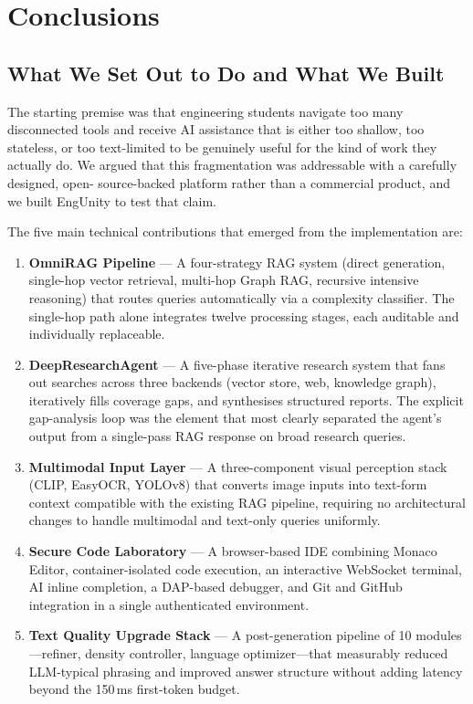\chapter{Conclusions}
\label{chap:conclusions}

\section{What We Set Out to Do and What We Built}
\label{sec:what-we-built}

The starting premise was that engineering students navigate too many disconnected
tools and receive AI assistance that is either too shallow, too stateless, or too
text-limited to be genuinely useful for the kind of work they actually do. We
argued that this fragmentation was addressable with a carefully designed, open-
source-backed platform rather than a commercial product, and we built EngUnity
to test that claim.

The five main technical contributions that emerged from the implementation are:

\begin{enumerate}
    \item \textbf{OmniRAG Pipeline} --- A four-strategy RAG system (direct
    generation, single-hop vector retrieval, multi-hop Graph RAG, recursive
    intensive reasoning) that routes queries automatically via a complexity
    classifier. The single-hop path alone integrates twelve processing stages,
    each auditable and individually replaceable.

    \item \textbf{DeepResearchAgent} --- A five-phase iterative research system
    that fans out searches across three backends (vector store, web, knowledge
    graph), iteratively fills coverage gaps, and synthesises structured reports.
    The explicit gap-analysis loop was the element that most clearly separated
    the agent's output from a single-pass RAG response on broad research queries.

    \item \textbf{Multimodal Input Layer} --- A three-component visual
    perception stack (CLIP, EasyOCR, YOLOv8) that converts image inputs into
    text-form context compatible with the existing RAG pipeline, requiring no
    architectural changes to handle multimodal and text-only queries uniformly.

    \item \textbf{Secure Code Laboratory} --- A browser-based IDE combining
    Monaco Editor, container-isolated code execution, an interactive WebSocket
    terminal, AI inline completion, a DAP-based debugger, and Git and GitHub
    integration in a single authenticated environment.

    \item \textbf{Text Quality Upgrade Stack} --- A post-generation pipeline
    of 10 modules---refiner, density controller, language optimizer---that
    measurably reduced LLM-typical phrasing and improved answer structure
    without adding latency beyond the 150\,ms first-token budget.
\end{enumerate}

